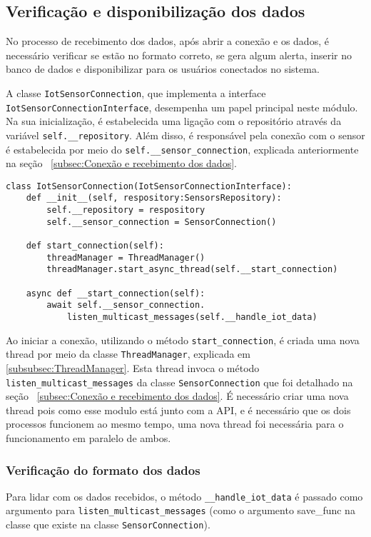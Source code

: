 \subsection[Verificação e disponibilização dos dados]{Verificação e disponibilização dos dados}\label{subsec:checkDataReceived}
No processo de recebimento dos dados, após abrir a conexão e os dados, é necessário verificar se estão no formato correto, se gera algum alerta, inserir no banco de dados e disponibilizar para os usuários conectados no sistema.

A classe \texttt{IotSensorConnection}, que implementa a interface \texttt{IotSensorConnectionInterface}, desempenha um papel principal neste módulo. Na sua inicialização, é estabelecida uma ligação com o repositório através da variável \texttt{self.\_\_repository}. Além disso, é responsável pela conexão com o sensor é estabelecida por meio do \texttt{self.\_\_sensor\_connection}, explicada anteriormente na seção ~\ref{subsec:Conexão e recebimento dos dados}.

\begin{verbatim}
class IotSensorConnection(IotSensorConnectionInterface):
    def __init__(self, respository:SensorsRepository):
        self.__repository = respository
        self.__sensor_connection = SensorConnection()
    
    def start_connection(self):
        threadManager = ThreadManager()
        threadManager.start_async_thread(self.__start_connection)
    
    async def __start_connection(self):
        await self.__sensor_connection.
            listen_multicast_messages(self.__handle_iot_data)
\end{verbatim}

Ao iniciar a conexão, utilizando o método \texttt{start\_connection}, é criada uma nova thread por meio da classe \texttt{ThreadManager}, explicada em \ref{subsubsec:ThreadManager}. Esta thread invoca o método \texttt{listen\_multicast\_messages} da classe \texttt{SensorConnection} que foi detalhado na seção ~\ref{subsec:Conexão e recebimento dos dados}. É necessário criar uma nova thread pois como esse modulo está junto com a \gls{API}, e é necessário que os dois processos funcionem ao mesmo tempo, uma nova thread foi necessária para o funcionamento em paralelo de ambos.

\subsubsection{Verificação do formato dos dados}
Para lidar com os dados recebidos, o método \texttt{\_\_handle\_iot\_data} é passado como argumento para \texttt{listen\_multicast\_messages} (como o argumento save\_func na classe que existe na classe \texttt{SensorConnection}).

